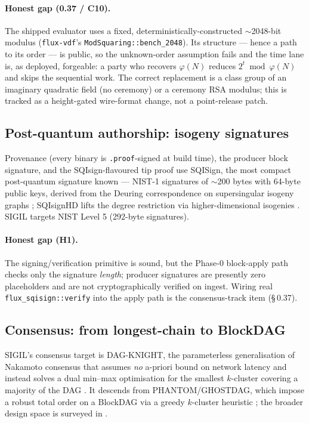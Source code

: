 \paragraph{Honest gap (0.37 / C10).} The shipped evaluator uses a fixed,
deterministically-constructed $\sim$2048-bit modulus (\texttt{flux-vdf}'s
\texttt{ModSquaring::bench\_2048}). Its structure — hence a path to its order — is
public, so the unknown-order assumption fails and the time lane is, as deployed,
forgeable: a party who recovers $\varphi(N)$ reduces $2^{t}\bmod\varphi(N)$ and
skips the sequential work. The correct replacement is a class group of an
imaginary quadratic field (no ceremony) or a ceremony RSA modulus; this is
tracked as a height-gated wire-format change, not a point-release patch.

\subsection{Post-quantum authorship: isogeny signatures}
Provenance (every binary is \texttt{.proof}-signed at build time), the producer
block signature, and the SQIsign-flavoured tip proof use SQISign, the most
compact post-quantum signature known — NIST-1 signatures of $\sim$200 bytes with
64-byte public keys, derived from the Deuring correspondence on supersingular
isogeny graphs \cite{sqisign2020}; SQIsignHD lifts the degree restriction via
higher-dimensional isogenies \cite{sqisignhd2023}. SIGIL targets NIST Level 5
(292-byte signatures).

\paragraph{Honest gap (H1).} The signing/verification primitive is sound, but the
Phase-0 block-apply path checks only the signature \emph{length}; producer
signatures are presently zero placeholders and are not cryptographically
verified on ingest. Wiring real \texttt{flux\_sqisign::verify} into the apply
path is the consensus-track item (\S\,0.37).

\subsection{Consensus: from longest-chain to BlockDAG}
SIGIL's consensus target is DAG-KNIGHT, the parameterless generalisation of
Nakamoto consensus that assumes \emph{no} a-priori bound on network latency and
instead solves a dual min--max optimisation for the smallest $k$-cluster
covering a majority of the DAG \cite{dagknight2022}. It descends from
PHANTOM/GHOSTDAG, which impose a robust total order on a BlockDAG via a greedy
$k$-cluster heuristic \cite{ghostdag2018}; the broader design space is surveyed
in \cite{sokdag2024}.

